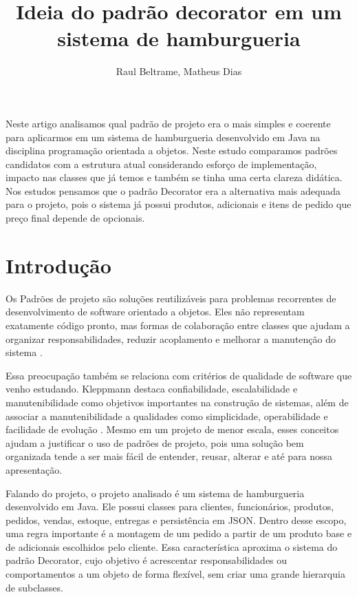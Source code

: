 \documentclass[12pt]{article}
\title{Ideia do padrão decorator em um sistema de hamburgueria}
\author{Raul Beltrame\inst{1}, Matheus Dias\inst{1}}
\begin{document}
\maketitle

\begin{resumo}
Neste artigo analisamos qual padrão de projeto era o mais simples e coerente para aplicarmos
em um sistema de hamburgueria desenvolvido em Java na disciplina programação
orientada a objetos. Neste estudo comparamos padrões candidatos com a estrutura atual
considerando esforço de implementação, impacto nas classes
que já temos e também se tinha uma certa clareza didática. Nos estudos pensamos que
o padrão Decorator era a alternativa mais adequada para o projeto, pois o sistema
já possui produtos, adicionais e itens de pedido que preço final depende de opcionais.
\end{resumo}

\section{Introdução}

Os Padrões de projeto são soluções reutilizáveis para problemas recorrentes de
desenvolvimento de software orientado a objetos. Eles não representam exatamente código
pronto, mas formas de colaboração entre classes que ajudam a organizar
responsabilidades, reduzir acoplamento e melhorar a manutenção do sistema
\cite{gamma1994}.

Essa preocupação também se relaciona com critérios de qualidade de
software que venho estudando. Kleppmann destaca confiabilidade, escalabilidade e manutenibilidade
como objetivos importantes na construção de sistemas, além de associar a
manutenibilidade a qualidades como simplicidade, operabilidade e
facilidade de evolução \cite{kleppmann2017}. Mesmo em um projeto de menor escala,
esses conceitos ajudam a justificar o uso de padrões de projeto,
pois uma solução bem organizada tende a ser mais fácil de entender, reusar, alterar e 
até para nossa apresentação.

Falando do projeto, o projeto analisado é um sistema de hamburgueria desenvolvido em Java. Ele
possui classes para clientes, funcionários, produtos, pedidos, vendas,
estoque, entregas e persistência em JSON. Dentro desse escopo, uma regra
importante é a montagem de um pedido a partir de um produto base e de
adicionais escolhidos pelo cliente. Essa característica aproxima o sistema do
padrão Decorator, cujo objetivo é acrescentar responsabilidades ou
comportamentos a um objeto de forma flexível, sem criar uma grande hierarquia
de subclasses.
\end{document}
